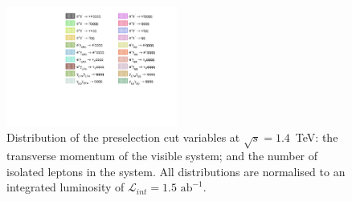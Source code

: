 \begin{figure}[h!]
\centering
{}
 \hfill
\includegraphics[width=0.5\textwidth]{PhysicsAnalysis/Plots/PreSelection/1400GeV/Legend.pdf}
\caption[Distribution of the preselection cut variables at $\sqrt{s}=1.4$~TeV: \protect{} the transverse momentum of the visible system; and \protect{} the number of isolated leptons in the system.  All distributions are normalised to an integrated luminosity of $\mathcal{L}_{int} = 1.5\text{ ab}^{-1}$.]{Distribution of the preselection cut variables at $\sqrt{s}=1.4$~TeV: \protect{} the transverse momentum of the visible system; and \protect{} the number of isolated leptons in the system.  All distributions are normalised to an integrated luminosity of $\mathcal{L}_{int} = 1.5\text{ ab}^{-1}$.}
\label{fig:preselection1400}
\end{figure}

